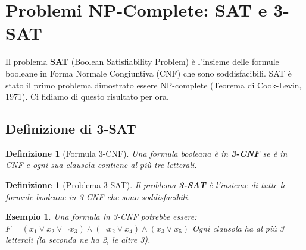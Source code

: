 \documentclass[a4paper, 11pt]{book} %
\newtheorem{definition}[theorem]{Definizione}
\newtheorem{example}[theorem]{Esempio}
\theoremstyle{definition}
\begin{document}


\section{Problemi NP-Complete: SAT e 3-SAT}

Il problema \textbf{SAT} (Boolean Satisfiability Problem) è l'insieme delle formule booleane in Forma Normale Congiuntiva (CNF) che sono soddisfacibili. SAT è stato il primo problema dimostrato essere NP-complete (Teorema di Cook-Levin, 1971). Ci fidiamo di questo risultato per ora.

\subsection{Definizione di 3-SAT}

\begin{definition}[Formula 3-CNF]
Una formula booleana è in \textbf{3-CNF} se è in CNF e ogni sua clausola contiene \emph{al più} tre letterali.
\end{definition}

\begin{definition}[Problema 3-SAT]
Il problema \textbf{3-SAT} è l'insieme di tutte le formule booleane in 3-CNF che sono soddisfacibili.
\end{definition}

\begin{example}
Una formula in 3-CNF potrebbe essere:
$F = (x_1 \lor x_2 \lor \neg x_3) \land (\neg x_2 \lor x_4) \land (x_3 \lor x_5)$
Ogni clausola ha al più 3 letterali (la seconda ne ha 2, le altre 3).
\end{example}
\end{document}
